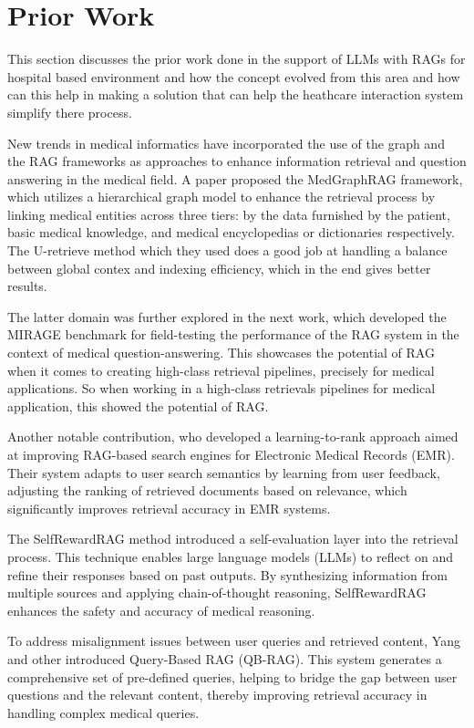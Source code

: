 \section{Prior Work}
This section discusses the prior work done in the support of LLMs with RAGs for hospital based environment and how the concept evolved from this area and how can this help in making a solution that can help the heathcare interaction system simplify there process.

New trends in medical informatics have incorporated the use of the graph and the RAG frameworks as approaches to enhance information retrieval and question answering in the medical field. A paper proposed the MedGraphRAG framework\cite{wu2024medicalgraphragsafe}, which utilizes a hierarchical graph model to enhance the retrieval process by linking medical entities across three tiers: by the data furnished by the patient, basic medical knowledge, and medical encyclopedias or dictionaries respectively.  The U-retrieve method which they used does a good job at handling a balance between global contex and indexing efficiency, which in the end gives better results.

The latter domain was further explored in the next work, which developed the MIRAGE benchmark\cite{xiong2024benchmarkingretrievalaugmentedgenerationmedicine} for field-testing the performance of the RAG system in the context of medical question-answering. This showcases the potential of RAG when it comes to creating high-class retrieval pipelines, precisely for medical applications. So when working in a high-class retrievals pipelines for medical application, this showed the potential of RAG\@.

Another notable contribution, who developed a learning-to-rank approach\cite{YE202493} aimed at improving RAG-based search engines for Electronic Medical Records (EMR). Their system adapts to user search semantics by learning from user feedback, adjusting the ranking of retrieved documents based on relevance, which significantly improves retrieval accuracy in EMR systems.

The SelfRewardRAG method\cite{10620139} introduced a self-evaluation layer into the retrieval process. This technique enables large language models (LLMs) to reflect on and refine their responses based on past outputs. By synthesizing information from multiple sources and applying chain-of-thought reasoning, SelfRewardRAG enhances the safety and accuracy of medical reasoning.

To address misalignment issues between user queries and retrieved content, Yang and other introduced Query-Based RAG (QB-RAG)\cite{yang2024geometryqueriesquerybasedinnovations}. This system generates a comprehensive set of pre-defined queries, helping to bridge the gap between user questions and the relevant content, thereby improving retrieval accuracy in handling complex medical queries.

